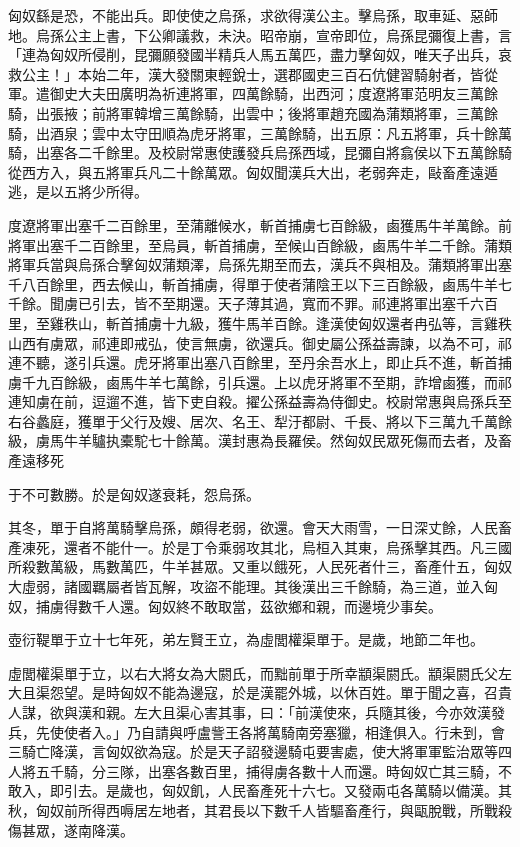\begin{pinyinscope}
匈奴繇是恐，不能出兵。即使使之烏孫，求欲得漢公主。擊烏孫，取車延、惡師地。烏孫公主上書，下公卿議救，未決。昭帝崩，宣帝即位，烏孫昆彌復上書，言「連為匈奴所侵削，昆彌願發國半精兵人馬五萬匹，盡力擊匈奴，唯天子出兵，哀救公主！」本始二年，漢大發關東輕銳士，選郡國吏三百石伉健習騎射者，皆從軍。遣御史大夫田廣明為祈連將軍，四萬餘騎，出西河；度遼將軍范明友三萬餘騎，出張掖；前將軍韓增三萬餘騎，出雲中；後將軍趙充國為蒲類將軍，三萬餘騎，出酒泉；雲中太守田順為虎牙將軍，三萬餘騎，出五原：凡五將軍，兵十餘萬騎，出塞各二千餘里。及校尉常惠使護發兵烏孫西域，昆彌自將翕侯以下五萬餘騎從西方入，與五將軍兵凡二十餘萬眾。匈奴聞漢兵大出，老弱奔走，敺畜產遠遁逃，是以五將少所得。

度遼將軍出塞千二百餘里，至蒲離候水，斬首捕虜七百餘級，鹵獲馬牛羊萬餘。前將軍出塞千二百餘里，至烏員，斬首捕虜，至候山百餘級，鹵馬牛羊二千餘。蒲類將軍兵當與烏孫合擊匈奴蒲類澤，烏孫先期至而去，漢兵不與相及。蒲類將軍出塞千八百餘里，西去候山，斬首捕虜，得單于使者蒲陰王以下三百餘級，鹵馬牛羊七千餘。聞虜已引去，皆不至期還。天子薄其過，寬而不罪。祁連將軍出塞千六百里，至雞秩山，斬首捕虜十九級，獲牛馬羊百餘。逢漢使匈奴還者冉弘等，言雞秩山西有虜眾，祁連即戒弘，使言無虜，欲還兵。御史屬公孫益壽諫，以為不可，祁連不聽，遂引兵還。虎牙將軍出塞八百餘里，至丹余吾水上，即止兵不進，斬首捕虜千九百餘級，鹵馬牛羊七萬餘，引兵還。上以虎牙將軍不至期，詐增鹵獲，而祁連知虜在前，逗遛不進，皆下吏自殺。擢公孫益壽為侍御史。校尉常惠與烏孫兵至右谷蠡庭，獲單于父行及嫂、居次、名王、犁汙都尉、千長、將以下三萬九千萬餘級，虜馬牛羊驢执橐駝七十餘萬。漢封惠為長羅侯。然匈奴民眾死傷而去者，及畜產遠移死

于不可數勝。於是匈奴遂衰耗，怨烏孫。

其冬，單于自將萬騎擊烏孫，頗得老弱，欲還。會天大雨雪，一日深丈餘，人民畜產凍死，還者不能什一。於是丁令乘弱攻其北，烏桓入其東，烏孫擊其西。凡三國所殺數萬級，馬數萬匹，牛羊甚眾。又重以餓死，人民死者什三，畜產什五，匈奴大虛弱，諸國羈屬者皆瓦解，攻盜不能理。其後漢出三千餘騎，為三道，並入匈奴，捕虜得數千人還。匈奴終不敢取當，茲欲鄉和親，而邊境少事矣。

壺衍鞮單于立十七年死，弟左賢王立，為虛閭權渠單于。是歲，地節二年也。

虛閭權渠單于立，以右大將女為大閼氏，而黜前單于所幸顓渠閼氏。顓渠閼氏父左大且渠怨望。是時匈奴不能為邊寇，於是漢罷外城，以休百姓。單于聞之喜，召貴人謀，欲與漢和親。左大且渠心害其事，曰：「前漢使來，兵隨其後，今亦效漢發兵，先使使者入。」乃自請與呼盧訾王各將萬騎南旁塞獵，相逢俱入。行未到，會三騎亡降漢，言匈奴欲為寇。於是天子詔發邊騎屯要害處，使大將軍軍監治眾等四人將五千騎，分三隊，出塞各數百里，捕得虜各數十人而還。時匈奴亡其三騎，不敢入，即引去。是歲也，匈奴飢，人民畜產死十六七。又發兩屯各萬騎以備漢。其秋，匈奴前所得西嗕居左地者，其君長以下數千人皆驅畜產行，與甌脫戰，所戰殺傷甚眾，遂南降漢。


\end{pinyinscope}
